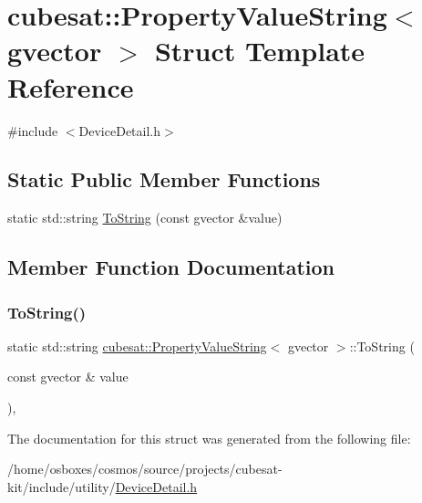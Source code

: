 \hypertarget{structcubesat_1_1PropertyValueString_3_01gvector_01_4}{}\section{cubesat\+:\+:Property\+Value\+String$<$ gvector $>$ Struct Template Reference}
\label{structcubesat_1_1PropertyValueString_3_01gvector_01_4}


{\ttfamily \#include $<$Device\+Detail.\+h$>$}

\subsection*{Static Public Member Functions}
\begin{DoxyCompactItemize}
\item 
static std\+::string \hyperlink{structcubesat_1_1PropertyValueString_3_01gvector_01_4_a7a1cda789209add2b9a79735d2d5c073}{To\+String} (const gvector \&value)
\end{DoxyCompactItemize}


\subsection{Member Function Documentation}
\mbox{\label{structcubesat_1_1PropertyValueString_3_01gvector_01_4_a7a1cda789209add2b9a79735d2d5c073}} 
\subsubsection{\texorpdfstring{To\+String()}{ToString()}}
{\footnotesize\ttfamily static std\+::string \hyperlink{structcubesat_1_1PropertyValueString}{cubesat\+::\+Property\+Value\+String}$<$ gvector $>$\+::To\+String (\begin{DoxyParamCaption}\item[{const gvector \&}]{value }\end{DoxyParamCaption})\hspace{0.3cm}{\ttfamily [inline]}, {\ttfamily [static]}}



The documentation for this struct was generated from the following file\+:\begin{DoxyCompactItemize}
\item 
/home/osboxes/cosmos/source/projects/cubesat-\/kit/include/utility/\hyperlink{DeviceDetail_8h}{Device\+Detail.\+h}\end{DoxyCompactItemize}
